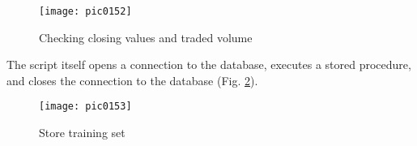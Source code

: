 \begin{figure}[h]
\centering
\texttt{[image: pic0152]}
\caption{Checking closing values and traded volume}
\label{fig:pic0152}
\end{figure}
\FloatBarrier

The script itself opens a connection to the database, executes a stored procedure, and closes the connection to the database (Fig. \ref{fig:pic0153}).

\begin{figure}[h]
\centering
\texttt{[image: pic0153]}
\caption{Store training set}
\label{fig:pic0153}
\end{figure}
\FloatBarrier
